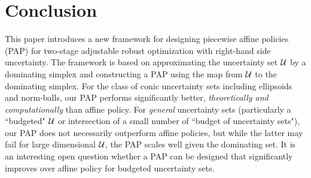 \documentclass[11pt]{article}
\theoremstyle{plain}
\theoremstyle{definition}
\numberwithin{equation}{section}%
\numberwithin{equation}{section}%
\begin{document}
\section{Conclusion}
This paper introduces a new framework for designing piecewise affine policies (PAP)  for two-stage adjustable robust optimization with right-hand side uncertainty. The framework is based on approximating the uncertainty set ${\cal U}$ by a dominating simplex and constructing a PAP using the map from ${\cal U}$ to the dominating simplex. For the class of conic uncertainty sets including ellipsoids and norm-balls, our PAP performs significantly better, \emph{theoretically and computationally} than affine policy.
For \emph{general} uncertainty sets (particularly a ``budgeted" ${\cal U}$ or intersection of a small number of ``budget of uncertainty sets"), our PAP does not necessarily outperform affine policies, but while the latter may fail for large dimensional ${\cal U}$, the PAP scales well given the dominating set. It is an interesting open question whether a PAP can be designed that significantly improves over affine policy for budgeted uncertainty sets. 




\end{document}
